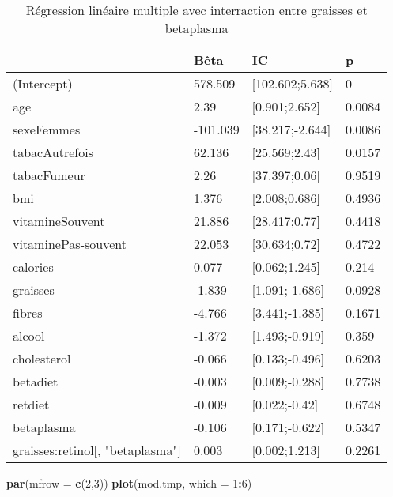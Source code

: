 \documentclass[]{article}
\newenvironment{Shaded}{\begin{snugshade}}{\end{snugshade}}
\newcommand{\KeywordTok}[1]{\textcolor[rgb]{0.13,0.29,0.53}{\textbf{#1}}}
\newcommand{\DataTypeTok}[1]{\textcolor[rgb]{0.13,0.29,0.53}{#1}}
\newcommand{\DecValTok}[1]{\textcolor[rgb]{0.00,0.00,0.81}{#1}}
\newcommand{\OperatorTok}[1]{\textcolor[rgb]{0.81,0.36,0.00}{\textbf{#1}}}
\newcommand{\NormalTok}[1]{#1}
\begin{document}
\begin{table}

\caption{\label{tab:unnamed-chunk-75}Régression linéaire multiple avec interraction entre graisses et betaplasma}
\centering
\begin{tabular}[t]{l|l|l|l}
\hline
  & Bêta & IC & p\\
\hline
\rowcolor[HTML]{BBD2E1}  (Intercept) & 578.509 & [102.602;5.638] & 0\\
\hline
age & 2.39 & [0.901;2.652] & 0.0084\\
\hline
\rowcolor[HTML]{BBD2E1}  sexeFemmes & -101.039 & [38.217;-2.644] & 0.0086\\
\hline
tabacAutrefois & 62.136 & [25.569;2.43] & 0.0157\\
\hline
\rowcolor[HTML]{BBD2E1}  tabacFumeur & 2.26 & [37.397;0.06] & 0.9519\\
\hline
bmi & 1.376 & [2.008;0.686] & 0.4936\\
\hline
\rowcolor[HTML]{BBD2E1}  vitamineSouvent & 21.886 & [28.417;0.77] & 0.4418\\
\hline
vitaminePas-souvent & 22.053 & [30.634;0.72] & 0.4722\\
\hline
\rowcolor[HTML]{BBD2E1}  calories & 0.077 & [0.062;1.245] & 0.214\\
\hline
graisses & -1.839 & [1.091;-1.686] & 0.0928\\
\hline
\rowcolor[HTML]{BBD2E1}  fibres & -4.766 & [3.441;-1.385] & 0.1671\\
\hline
alcool & -1.372 & [1.493;-0.919] & 0.359\\
\hline
\rowcolor[HTML]{BBD2E1}  cholesterol & -0.066 & [0.133;-0.496] & 0.6203\\
\hline
betadiet & -0.003 & [0.009;-0.288] & 0.7738\\
\hline
\rowcolor[HTML]{BBD2E1}  retdiet & -0.009 & [0.022;-0.42] & 0.6748\\
\hline
betaplasma & -0.106 & [0.171;-0.622] & 0.5347\\
\hline
\rowcolor[HTML]{BBD2E1}  graisses:retinol[, "betaplasma"] & 0.003 & [0.002;1.213] & 0.2261\\
\hline
\end{tabular}
\end{table}

\begin{Shaded}
\begin{Highlighting}[]
\KeywordTok{par}\NormalTok{(}\DataTypeTok{mfrow =} \KeywordTok{c}\NormalTok{(}\DecValTok{2}\NormalTok{,}\DecValTok{3}\NormalTok{))}
\KeywordTok{plot}\NormalTok{(mod.tmp, }\DataTypeTok{which =} \DecValTok{1}\OperatorTok{:}\DecValTok{6}\NormalTok{)}
\end{Highlighting}
\end{Shaded}
\end{document}
